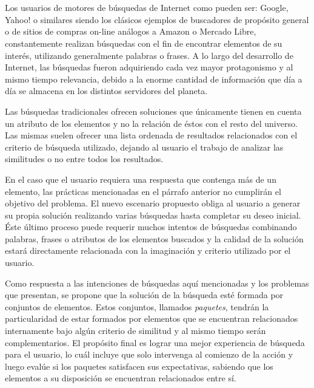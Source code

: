 \chapter*{\runtitulo}

\noindent 

Los usuarios de motores de búsquedas de Internet como pueden ser: Google, Yahoo! o similares siendo los clásicos ejemplos de buscadores de propósito general o de sitios de compras on-line análogos a Amazon o Mercado Libre, constantemente realizan búsquedas con el fin de encontrar elementos de su interés, utilizando generalmente palabras o frases. A lo largo del desarrollo de Internet, las búsquedas fueron adquiriendo cada vez mayor protagonismo y al mismo tiempo relevancia, debido a la enorme cantidad de información que día a día se almacena en los distintos servidores del planeta.

Las búsquedas tradicionales ofrecen soluciones que únicamente tienen en cuenta un atributo de los elementos y no la relación de éstos con el resto del universo. Las mismas suelen ofrecer una lista ordenada de resultados relacionados con el criterio de búsqueda utilizado, dejando al usuario el trabajo de analizar las similitudes o no entre todos los resultados.

En el caso que el usuario requiera una respuesta que contenga más de un elemento, las prácticas mencionadas en el párrafo anterior no cumplirán el objetivo del problema. El nuevo escenario propuesto obliga al usuario a generar su propia solución realizando varias búsquedas hasta completar su deseo inicial. Éste último proceso puede requerir muchos intentos de búsquedas combinando palabras, frases o atributos de los elementos buscados y la calidad de la solución estará directamente relacionada con la imaginación y criterio utilizado por el usuario.

Como respuesta a las intenciones de búsquedas aquí mencionadas y los problemas que presentan, se propone que la solución de la búsqueda esté formada por conjuntos de elementos. Estos conjuntos, llamados {\em paquetes}, tendrán la particularidad de estar formados por elementos que se encuentran relacionados internamente bajo algún criterio de similitud y al mismo tiempo serán complementarios. El propósito final es lograr una mejor experiencia de búsqueda para el usuario, lo cuál incluye que solo intervenga al comienzo de la acción y luego evalúe si los paquetes satisfacen sus expectativas, sabiendo que los elementos a su disposición se encuentran relacionados entre sí.

